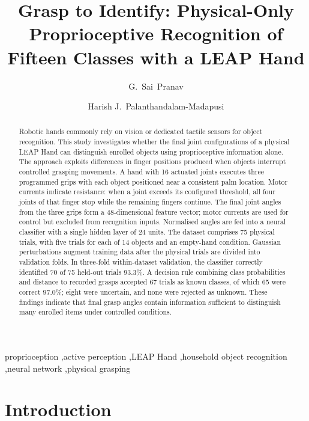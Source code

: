 \documentclass[authoryear,12pt]{elsarticle}
\begin{document}
\begin{frontmatter}

\title{Grasp to Identify: Physical-Only Proprioceptive Recognition
of Fifteen Classes with a LEAP Hand}

\author{G.~Sai~Pranav}
\author{Harish J.~Palanthandalam-Madapusi}

\begin{abstract}
Robotic hands commonly rely on vision or dedicated tactile sensors for object recognition. This study investigates whether the final joint configurations of a physical LEAP Hand can distinguish enrolled objects using proprioceptive information alone. The approach exploits differences in finger positions produced when objects interrupt controlled grasping movements. A hand with 16 actuated joints executes three programmed grips with each object positioned near a consistent palm location. Motor currents indicate resistance: when a joint exceeds its configured threshold, all four joints of that finger stop while the remaining fingers continue. The final joint angles from the three grips form a 48-dimensional feature vector; motor currents are used for control but excluded from recognition inputs. Normalised angles are fed into a neural classifier with a single hidden layer of 24 units. The dataset comprises 75 physical trials, with five trials for each of 14 objects and an empty-hand condition. Gaussian perturbations augment training data after the physical trials are divided into validation folds. In three-fold within-dataset validation, the classifier correctly identified 70 of 75 held-out trials \(93.3\%\). A decision rule combining class probabilities and distance to recorded grasps accepted 67 trials as known classes, of which 65 were correct \(97.0\%\); eight were uncertain, and none were rejected as unknown. These findings indicate that final grasp angles contain information sufficient to distinguish many enrolled items under controlled conditions. 
\end{abstract}


\begin{keyword}
proprioception \sep active perception \sep LEAP Hand \sep household
object recognition \sep neural network \sep physical grasping
\end{keyword}

\end{frontmatter}

\section{Introduction}
\end{document}
